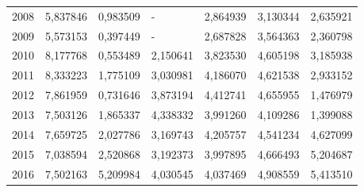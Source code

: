 \begin{table}
\begin{tabular}{p{1cm}p{2cm}p{2cm}p{2cm}p{2cm}p{2cm}p{2cm}}
 2008 &                                     5,837846 &                         0,983509 &                                   - &                                    2,864939 &                                3,130344 &                2,635921 \\
 2009 &                                     5,573153 &                         0,397449 &                                   - &                                    2,687828 &                                3,564363 &                2,360798 \\
 2010 &                                     8,177768 &                         0,553489 &                            2,150641 &                                    3,823530 &                                4,605198 &                3,185938 \\
 2011 &                                     8,333223 &                         1,775109 &                            3,030981 &                                    4,186070 &                                4,621538 &                2,933152 \\
 2012 &                                     7,861959 &                         0,731646 &                            3,873194 &                                    4,412741 &                                4,655955 &                1,476979 \\
 2013 &                                     7,503126 &                         1,865337 &                            4,338332 &                                    3,991260 &                                4,109286 &                1,399088 \\
 2014 &                                     7,659725 &                         2,027786 &                            3,169743 &                                    4,205757 &                                4,541234 &                4,627099 \\
 2015 &                                     7,038594 &                         2,520868 &                            3,192373 &                                    3,997895 &                                4,666493 &                5,204687 \\
 2016 &                                     7,502163 &                         5,209984 &                            4,030545 &                                    4,037469 &                                4,908559 &                5,413510 \\
\bottomrule
\end{tabular}
\end{table}
